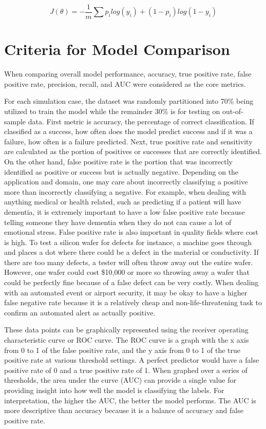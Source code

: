 \documentclass{llncs}
\begin{document}
\begin{equation}
J(\theta) = -\frac{1}{m}\sum p_{i}log(y_{i}) + (1-p_{i})log(1-y_{i})
\end{equation}

\section{Criteria for Model Comparison}

When comparing overall model performance, accuracy, true positive rate, false positive rate, precision, recall, and AUC were considered as the core metrics.

For each simulation case, the dataset was randomly partitioned into 70\% being utilized to train the model while the remainder 30\% is for testing on out-of-sample data. First metric is accuracy, the percentage of correct classification. If classified as a success, how often does the model predict success and if it was a failure, how often is a failure predicted. Next, true positive rate and sensitivity are calculated as the portion of positives or successes that are correctly identified. On the other hand, false positive rate is the portion that was incorrectly identified as positive or success but is actually negative.  Depending on the application and domain, one may care about incorrectly classifying a positive more than incorrectly classifying a negative.  For example, when dealing with anything medical or health related, such as predicting if a patient will have dementia, it is extremely important to have a low false positive rate because telling someone they have dementia when they do not can cause a lot of emotional stress.  False positive rate is also important in quality fields where cost is high.  To test a silicon wafer for defects for instance, a machine goes through and places a dot where there could be a defect in the material or conductivity.  If there are too many defects, a tester will often throw away out the entire wafer.  However, one wafer could cost \$10,000 or more so throwing away a wafer that could be perfectly fine because of a false defect can be very costly.  When dealing with an automated event or airport security, it may be okay to have a higher false negative rate because it is a relatively cheap and non-life-threatening task to confirm an automated alert as actually positive.

These data points can be graphically represented using the receiver operating characteristic curve or ROC curve.  The ROC curve is a graph with the x axis from 0 to 1 of the false positive rate, and the y axis from 0 to 1 of the true positive rate at various threshold settings.  A perfect predictor would have a false positive rate of 0 and a true positive rate of 1.  When graphed over a series of thresholds, the area under the curve (AUC) can provide a single value for providing insight into how well the model is classifying the labels. For interpretation, the higher the AUC, the better the model performs. The AUC is more descriptive than accuracy because it is a balance of accuracy and false positive rate.
\end{document}
